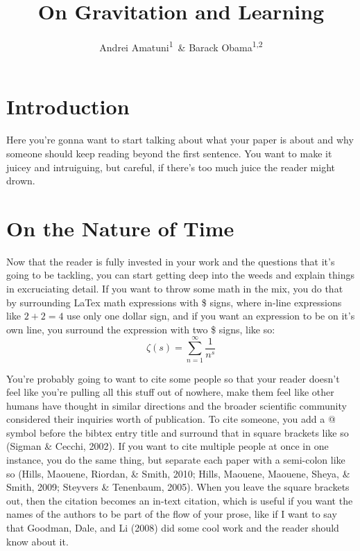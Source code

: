 \documentclass[man,floatsintext]{apa6}
\title{On Gravitation and Learning}
\author{Andrei Amatuni\textsuperscript{1}~\& Barack Obama\textsuperscript{1,2}}
\date{}
\affiliation{
\vspace{0.5cm}
\textsuperscript{1} Indiana University\\\textsuperscript{2} University of Chicago}
\begin{document}
\maketitle

\hypertarget{introduction}{%
\section{Introduction}\label{introduction}}

Here you're gonna want to start talking about what your paper is about and why someone should keep reading beyond the first sentence. You want to make it juicey and intruiguing, but careful, if there's too much juice the reader might drown.

\hypertarget{on-the-nature-of-time}{%
\section{On the Nature of Time}\label{on-the-nature-of-time}}

Now that the reader is fully invested in your work and the questions that it's going to be tackling, you can start getting deep into the weeds and explain things in excruciating detail. If you want to throw some math in the mix, you do that by surrounding LaTex math expressions with \$ signs, where in-line expressions like \(2 + 2 = 4\) use only one dollar sign, and if you want an expression to be on it's own line, you surround the expression with two \$ signs, like so: \[\zeta(s) = \sum_{n=1}^{\infty} \frac{1}{n^s}\]

You're probably going to want to cite some people so that your reader doesn't feel like you're pulling all this stuff out of nowhere, make them feel like other humans have thought in similar directions and the broader scientific community considered their inquiries worth of publication. To cite someone, you add a @ symbol before the bibtex entry title and surround that in square brackets like so (Sigman \& Cecchi, 2002). If you want to cite multiple people at once in one instance, you do the same thing, but separate each paper with a semi-colon like so (Hills, Maouene, Riordan, \& Smith, 2010; Hills, Maouene, Maouene, Sheya, \& Smith, 2009; Steyvers \& Tenenbaum, 2005). When you leave the square brackets out, then the citation becomes an in-text citation, which is useful if you want the names of the authors to be part of the flow of your prose, like if I want to say that Goodman, Dale, and Li (2008) did some cool work and the reader should know about it.
\end{document}
